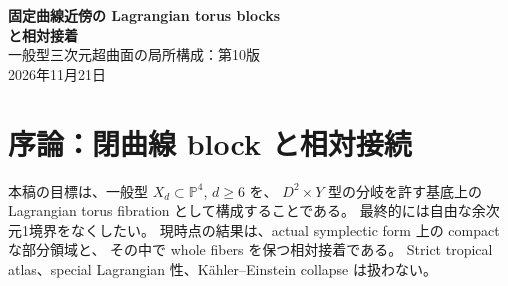 \documentclass[11pt,a4paper]{article}
\theoremstyle{definition}
\newcommand{\PP}{\mathbb P}
\begin{document}
\begin{center}
{\LARGE\sffamily\bfseries\color{ink}固定曲線近傍の Lagrangian torus blocks\\[0.3em]
と相対接着}\\[0.8em]
{\large 一般型三次元超曲面の局所構成：第10版}\\[0.45em]
2026年11月21日
\end{center}

\begin{abstract}
一般型三次元超曲面の、自由境界を持たない branched base 上の Lagrangian torus fibration を目指す。
本版の主結果は、任意の smooth $X_d\subset\PP^4$, $d\ge6$ と所定の K\"ahler form に対し、
degree $d-2$、genus $(d-3)(d-4)/2$ の closed symplectic curve $C'$ を、
symplectically trivial な normal bundle とともに構成することである。
Special algebraic member 上の plane curve を、smooth hypersurface family と Moser 法で移送する。
その曲線全体と full normal neighborhood を含む actual block に、
曲線方向の自由端も elliptic 成分もない Lagrangian $T^3$-fibration を作る。
Whole focus--hyperbolic fibers は $(d-2)(d-5)$ 個で、各 Euler 数は $-1$、
六次では4個となる。Normal faces と complement の fibration は未構成である。
Actual focus 補集合の基本群は $\mathbb Z$ であり，
両側の全整数境界写像を求める．
特に二次 homology の境界像の指数は $d-2$ である．
$e=d-2$，$g=(d-3)(d-4)/2$，$\Lambda=\mathbb Z[\tau,\tau^{-1}]$ とすると，
第二 homotopy 群は $\Lambda^{2g+1}\oplus\Lambda/(e(\tau-1))$，
$m$ 重巡回被覆の第二 homology は
$\mathbb Z^{m(2g+1)+1}\oplus(\mathbb Z/e)^{m-1}$ である．
一方、generic plane section の normal degree $2d$ は、splitting や generators を固定しない
smooth focus Cartan family に対しても障害になることを証明する。
曲線を puncture した product regions の whole-fiber count と boundary winding を計算し、
weighted collar の winding $m$ に応じた正則・hyperbolic・高次退化の区別を与える。
既存の positive normal shell、相対 caps、membrane families、面積・Maslov 障害を保持する。
旧48 regular ports の接続と、全 $X_d$ を覆う境界のない fibration は引き続き未証明である。
\end{abstract}

\section*{序論：閉曲線 block と相対接続}

本稿の目標は、一般型 $X_d\subset\PP^4$, $d\ge6$ を、
$D^2\times Y$ 型の分岐を許す基底上の Lagrangian torus fibration として構成することである。
最終的には自由な余次元1境界をなくしたい。
現時点の結果は、actual symplectic form 上の compact な部分領域と、
その中で whole fibers を保つ相対接着である。
Strict tropical atlas、special Lagrangian 性、Kähler--Einstein collapse は扱わない。
\end{document}
